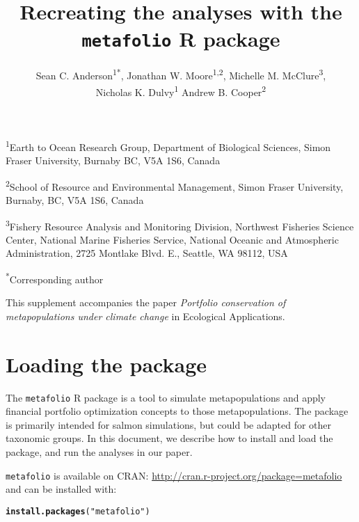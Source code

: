 \documentclass[10pt]{article}\usepackage[]{graphicx}\usepackage[]{color}
\makeatletter
\newcommand{\hlstr}[1]{\textcolor[rgb]{0.192,0.494,0.8}{#1}}%
\newcommand{\hlstd}[1]{\textcolor[rgb]{0.345,0.345,0.345}{#1}}%
\newcommand{\hlkwd}[1]{\textcolor[rgb]{0.737,0.353,0.396}{\textbf{#1}}}%
\newenvironment{kframe}{%
 \def\at@end@of@kframe{}%
 \ifinner\ifhmode%
  \def\at@end@of@kframe{\end{minipage}}%
  \begin{minipage}{\columnwidth}%
 \fi\fi%
 \def\FrameCommand##1{\hskip\@totalleftmargin \hskip-\fboxsep
 \colorbox{shadecolor}{##1}\hskip-\fboxsep
     \hskip-\linewidth \hskip-\@totalleftmargin \hskip\columnwidth}%
 \MakeFramed {\advance\hsize-\width
   \@totalleftmargin\z@ \linewidth\hsize
   \@setminipage}}%
 {\par\unskip\endMakeFramed%
 \at@end@of@kframe}
\newenvironment{knitrout}{}{} %
\makeatother
\begin{document}
\title{Recreating the analyses with the \texttt{metafolio} \textsf{R} package}

\author{
Sean C. Anderson\textsuperscript{1*},
Jonathan W. Moore\textsuperscript{1,2},
Michelle M. McClure\textsuperscript{3},\\
Nicholas K. Dulvy\textsuperscript{1}
Andrew B. Cooper\textsuperscript{2}
}

\date{}
\maketitle

\textsuperscript{1}Earth to Ocean Research Group, Department of Biological Sciences, Simon Fraser University, Burnaby BC, V5A 1S6, Canada

\textsuperscript{2}School of Resource and Environmental Management, Simon Fraser University, Burnaby, BC, V5A 1S6, Canada

\textsuperscript{3}Fishery Resource Analysis and Monitoring Division, Northwest Fisheries Science Center, National Marine Fisheries Service, National Oceanic and Atmospheric Administration, 2725 Montlake Blvd. E., Seattle, WA 98112, USA

\noindent
\textsuperscript{*}Corresponding author

\bigskip

This supplement accompanies the paper \textit{Portfolio conservation of metapopulations under climate change} in Ecological Applications.

\section{Loading the package}

The \texttt{metafolio} \textsf{R} package is a tool to simulate metapopulations
and apply financial portfolio optimization concepts to those metapopulations.
The package is primarily intended for salmon simulations, but could be adapted
for other taxonomic groups. In this document, we describe how to install and
load the package, and run the analyses in our paper.

\texttt{metafolio} is available on CRAN:
\url{http://cran.r-project.org/package=metafolio} and can be installed with:

\begin{knitrout}
\color{fgcolor}\begin{kframe}
\begin{alltt}
\hlkwd{install.packages}\hlstd{(}\hlstr{"metafolio"}\hlstd{)}
\end{alltt}
\end{kframe}
\end{knitrout}
\end{document}
